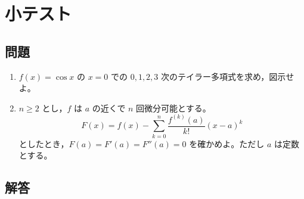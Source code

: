 \documentclass[a4paper,12pt]{jsarticle}
\theoremstyle{definition}
\begin{document}
\section*{小テスト}

\subsection*{問題}

\begin{enumerate}
\item $f(x)=\cos x$ の $x=0$ での $0,1,2,3$ 次のテイラー多項式を求め，図示せよ。

\item $n\geq 2$ とし，$f$ は $a$ の近くで $n$ 回微分可能とする。
\[
F(x)=f(x)-\sum_{k=0}^{n}\frac{f^{(k)}(a)}{k!}(x-a)^k
\]
としたとき，$F(a)=F'(a)=F''(a)=0$ を確かめよ。ただし $a$ は定数とする。
\end{enumerate}

\subsection*{解答}
\end{document}
